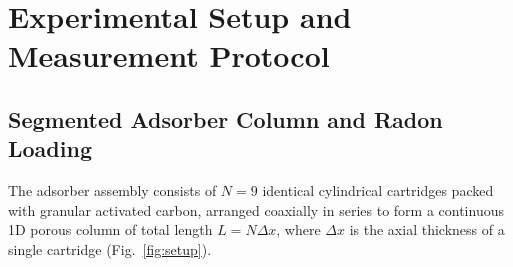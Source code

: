 \documentclass[11pt,a4paper]{article}
\begin{document}
\section{Experimental Setup and Measurement Protocol}

\subsection{Segmented Adsorber Column and Radon Loading}
The adsorber assembly consists of $N=9$ identical cylindrical cartridges packed with granular activated carbon, arranged coaxially in series to form a continuous 1D porous column of total length $L = N\Delta x$, where $\Delta x$ is the axial thickness of a single cartridge (Fig.~\ref{fig:setup}). 
\end{document}
